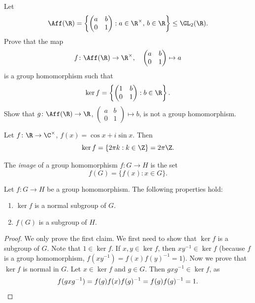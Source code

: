 \begin{exercise}
\label{xca:affine}
Let
\[
\Aff(\R)=\left\{\begin{pmatrix}a&b\\0&1\end{pmatrix}:a\in\R^\times,\,b\in\R\right\}\leq\GL_2(\R).
\]
Prove that the map
\[
f\colon \Aff(\R)\to\R^\times,\quad
\begin{pmatrix}
a&b\\
0&1
\end{pmatrix}
\mapsto a
\]
is a group homomorphism such that 
\[
\ker f=\left\{\begin{pmatrix}
1&b\\
0&1
\end{pmatrix} : b\in \R
\right\}.
\]
Show that $g\colon\Aff(\R)\to\R$, $\begin{pmatrix}a&b\\0&1\end{pmatrix}\mapsto b$,
is not a group homomorphism.
\end{exercise}



\begin{example}
Let $f\colon\R\to\C^\times$, $f(x)=\cos x+i\sin x$. Then 
\[
\ker f=\{2\pi k:k\in\Z\}=2\pi\Z.
\]
\end{example}

\begin{definition}
The \emph{image} of a group homomorphism $f\colon G\to H$
is the set 
\[
f(G)=\{f(x):x\in G\}.
\]
\end{definition}

\begin{proposition}
    Let $f\colon G\to H$ be a group homomorphism.
    The following properties hold: 
        \begin{enumerate}
                \item $\ker f$ is a normal subgroup of $G$.
                \item $f(G)$ is a subgroup of $H$.
        \end{enumerate}
\end{proposition}

\begin{proof}
    We only prove the first claim. We first need to show that 
    $\ker f$ is a subgroup of $G$. Note that
    $1\in \ker f$. If $x,y\in\ker f$, then
    $xy^{-1}\in\ker f$ (because $f$ is a group homomorphism, 
    $f(xy^{-1})=f(x)f(y)^{-1}=1$). Now we prove that $\ker f$ is normal in $G$. Let $x\in\ker f$ and $g\in G$. Then $gxg^{-1}\in\ker f$, as 
    \[
    f(gxg^{-1})=f(g)f(x)f(g)^{-1}=f(g)f(g)^{-1}=1.\qedhere
    \]
\end{proof}

